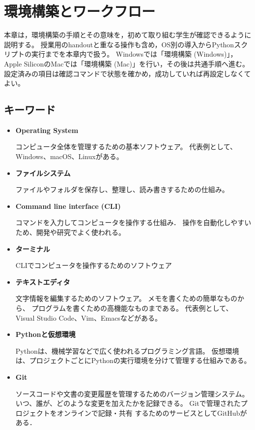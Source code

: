 \chapter{環境構築とワークフロー}

本章は，環境構築の手順とその意味を，初めて取り組む学生が確認できるように説明する。
授業用のhandoutと重なる操作も含め，OS別の導入からPythonスクリプトの実行までを本章内で扱う。
Windowsでは「環境構築 (Windows)」，Apple SiliconのMacでは「環境構築 (Mac)」を行い，その後は共通手順へ進む。
設定済みの項目は確認コマンドで状態を確かめ，成功していれば再設定しなくてよい。

\section{キーワード}

\begin{itemize}
\item \textbf{Operating System}

コンピュータ全体を管理するための基本ソフトウェア。
代表例として、Windows、macOS、Linuxがある。

\item \textbf{ファイルシステム}

ファイルやフォルダを保存し、整理し、読み書きするための仕組み。

\item \textbf{Command line interface (CLI)}

コマンドを入力してコンピュータを操作する仕組み．
操作を自動化しやすいため、開発や研究でよく使われる。

\item \textbf{ターミナル}

CLIでコンピュータを操作するためのソフトウェア

\item \textbf{テキストエディタ}

文字情報を編集するためのソフトウェア。
メモを書くための簡単なものから、
プログラムを書くための高機能なものまである。
代表例として、Visual Studio Code、Vim、Emacsなどがある。

\item \textbf{Pythonと仮想環境}

Pythonは、機械学習などで広く使われるプログラミング言語。
仮想環境は、プロジェクトごとにPythonの実行環境を分けて管理する仕組みである。

\item \textbf{Git}

ソースコードや文書の変更履歴を管理するためのバージョン管理システム。
いつ、誰が、どのような変更を加えたかを記録できる。
Gitで管理されたプロジェクトをオンラインで記録・共有
するためのサービスとしてGitHubがある．

\end{itemize}

